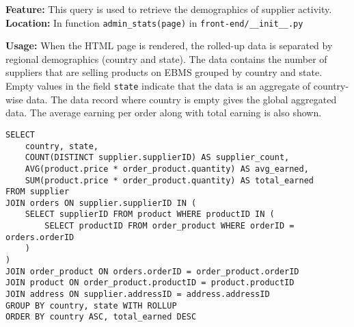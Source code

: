 \textbf{Feature:} This query is used to retrieve the demographics of supplier activity. \\
\textbf{Location:} In function \texttt{admin\_stats(page)} in \texttt{front-end/\_\_init\_\_.py}

\textbf{Usage:}
When the HTML page is rendered, the rolled-up data is separated by regional demographics (country and state).
The data contains the number of suppliers that are selling products on EBMS grouped by country and state.
Empty values in the field \texttt{state} indicate that the data is an aggregate of country-wise data.
The data record where country is empty gives the global aggregated data.
The average earning per order along with total earning is also shown.

\vspace*{30pt}

\begin{lstlisting}
SELECT
    country, state,
    COUNT(DISTINCT supplier.supplierID) AS supplier_count,
    AVG(product.price * order_product.quantity) AS avg_earned,
    SUM(product.price * order_product.quantity) AS total_earned
FROM supplier
JOIN orders ON supplier.supplierID IN (
    SELECT supplierID FROM product WHERE productID IN (
        SELECT productID FROM order_product WHERE orderID = orders.orderID
    )
)
JOIN order_product ON orders.orderID = order_product.orderID
JOIN product ON order_product.productID = product.productID
JOIN address ON supplier.addressID = address.addressID
GROUP BY country, state WITH ROLLUP
ORDER BY country ASC, total_earned DESC
\end{lstlisting}